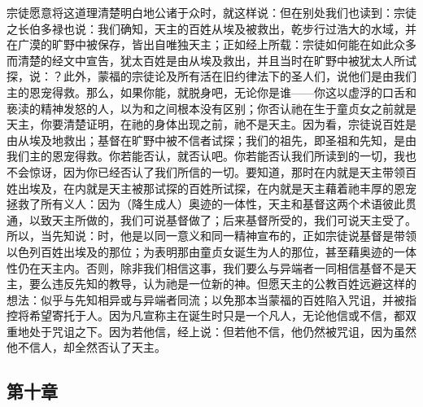 宗徒愿意将这道理清楚明白地公诸于众时，就这样说：但在别处我们也读到：宗徒之长伯多禄也说：我们确知，天主的百姓从埃及被救出，乾步行过浩大的水域，并在广漠的旷野中被保存，皆出自唯独天主；正如经上所载：宗徒如何能在如此众多而清楚的经文中宣告，犹太百姓是由从埃及救出，并且当时在旷野中被犹太人所试探，说：？此外，蒙福的宗徒论及所有活在旧约律法下的圣人们，说他们是由我们主的恩宠得救。那么，如果你能，就脱身吧，无论你是谁——你这以虚浮的口舌和亵渎的精神发怒的人，以为和之间根本没有区别；你否认祂在生于童贞女之前就是天主，你要清楚证明，在祂的身体出现之前，祂不是天主。因为看，宗徒说百姓是由从埃及地救出；基督在旷野中被不信者试探；我们的祖先，即圣祖和先知，是由我们主的恩宠得救。你若能否认，就否认吧。你若能否认我们所读到的一切，我也不会惊讶，因为你已经否认了我们所信的一切。要知道，那时在内就是天主带领百姓出埃及，在内就是天主被那试探的百姓所试探，在内就是天主藉着祂丰厚的恩宠拯救了所有义人：因为（降生成人）奥迹的一体性，天主和基督这两个术语彼此贯通，以致天主所做的，我们可说基督做了；后来基督所受的，我们可说天主受了。所以，当先知说：时，他是以同一意义和同一精神宣布的，正如宗徒说基督是带领以色列百姓出埃及的那位；为表明那由童贞女诞生为人的那位，甚至藉奥迹的一体性仍在天主内。否则，除非我们相信这事，我们要么与异端者一同相信基督不是天主，要么违反先知的教导，认为祂是一位新的神。但愿天主的公教百姓远避这样的想法：似乎与先知相异或与异端者同流；以免那本当蒙福的百姓陷入咒诅，并被指控将希望寄托于人。因为凡宣称主在诞生时只是一个凡人，无论他信或不信，都双重地处于咒诅之下。因为若他信，经上说：但若他不信，他仍然被咒诅，因为虽然他不信人，却全然否认了天主。\par


\subsection{第十章}

